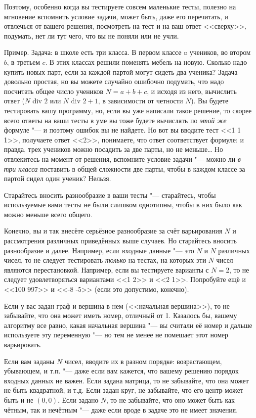 \documentclass[a4paper,10pt]{problems}
\begin{document}
Поэтому, особенно когда вы тестируете совсем маленькие тесты, полезно на мгновение вспомнить условие задачи, может быть, даже его перечитать,
и отвлечься от вашего решения, посмотреть на тест и на ваш ответ <<сверху>>, подумать, нет ли тут чего, что вы не поняли или не учли.

Пример. Задача: в школе есть три класса. В первом классе $a$ учеников, во втором $b$, в третьем $c$. В этих классах решили поменять мебель на новую.
Сколько надо купить новых парт, если за каждой партой могут сидеть два ученика? 
Задача довольно простая, но вы можете случайно ошибочно подумать, что надо посчитать общее число учеников $N=a+b+c$, и исходя из него, 
вычислить ответ ($N\mbox{ div }2$ или $N\mbox{ div }2+1$, в зависимости от четности $N$). 
Вы будете тестировать вашу программу, но, если вы уже написали такое решение, то скорее всего ответы на ваши тесты в уме вы тоже
будете вычислять по \textit{этой же} формуле "--- и поэтому ошибок вы не найдете. Но вот вы вводите тест <<1 1 1>>, получаете ответ <<2>>,
понимаете, что ответ соответствует формуле: и правда, трех учеников можно посадить за две парты, но не меньше\dots{} 
Но отвлекитесь на момент от решения, вспомните условие задачи "--- можно ли \textit{в три класса} поставить в общей сложности две парты,
чтобы в каждом классе за партой сидел один ученик? Нельзя.

 Старайтесь вносить разнообразие в ваши тесты "--- старайтесь, чтобы используемые вами тесты не были слишком однотипны,
чтобы в них было как можно меньше всего общего.

Конечно, вы и так внесёте серьёзное разнообразие за счёт варьирования $N$ и рассмотрения различных приведённых выше случаев. 
Но старайтесь вносить разнообразие и далее. 
Например, если входные данные "--- это $N$ и $N$ различных чисел, то не следует тестировать \textit{только} на тестах, на которых эти $N$ чисел являются
перестановкой. 
Например, если вы тестируете варианты с $N=2$, то не следует удовлетворяться вариантами <<1 2>> и <<2 1>>. 
Попробуйте ещё и <<100 997>> и <<-8 -5>> (если это допустимо, конечно). 

Если у вас задан граф и вершина в нем (<<начальная вершина>>), то не забывайте, что она может иметь номер, отличный от 1. 
Казалось бы, вашему алгоритму все равно, какая начальная вершина "--- вы считали её номер и дальше используете эту переменную "---
но тем не менее не помешает этот номер варьировать.

Если вам заданы $N$ чисел, вводите их в разном порядке: возрастающем, убывающем, и т.п. "--- даже если вам кажется, что вашему решению порядок входных данных не важен. 
Если задана матрица, то не забывайте, что она может не быть квадратной, и т.д. 
Если задан круг, не забывайте, что его центр может быть и не $(0,0)$.
Если задано $N$, то не забывайте, что оно может быть как чётным, так и нечётным "--- даже если вроде в задаче это не имеет значения.
\end{document}
